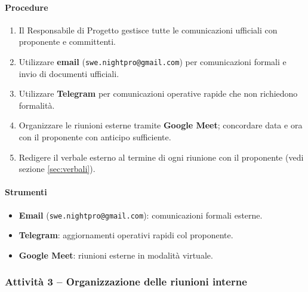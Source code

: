 \documentclass[a4paper, 11pt, oneside]{scrartcl}
\begin{document}
\paragraph{Procedure}
\begin{enumerate}
    \item Il Responsabile di Progetto gestisce tutte le comunicazioni ufficiali con proponente e committenti.
    \item Utilizzare \textbf{email} (\texttt{swe.nightpro@gmail.com}) per comunicazioni formali e invio di documenti ufficiali.
    \item Utilizzare \textbf{Telegram} per comunicazioni operative rapide che non richiedono formalità.
    \item Organizzare le riunioni esterne tramite \textbf{Google Meet}; concordare data e ora con il proponente con anticipo sufficiente.
    \item Redigere il verbale esterno al termine di ogni riunione con il proponente (vedi sezione \ref{sec:verbali}).
\end{enumerate}

\paragraph{Strumenti}
\begin{itemize}
    \item \textbf{Email} (\texttt{swe.nightpro@gmail.com}): comunicazioni formali esterne.
    \item \textbf{Telegram}: aggiornamenti operativi rapidi col proponente.
    \item \textbf{Google Meet}: riunioni esterne in modalità virtuale.
\end{itemize}

\subsubsection{Attività 3 – Organizzazione delle riunioni interne}
\end{document}
